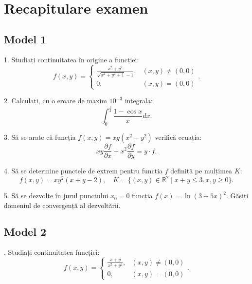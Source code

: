 \chapter{Recapitulare examen}

\section{Model 1}

1. Studiați continuitatea în origine a funcției:
\[
  f(x, y) = \begin{cases}
    \frac{x^2 + y^2}{\sqrt{x^2 + y^2 + 1} - 1}, & (x, y) \neq (0, 0) \\
    0, & (x, y) = (0, 0)
  \end{cases}.
\]

\vspace{1cm}

2. Calculați, cu o eroare de maxim $ 10^{-3} $ integrala:
\[
  \int_0^{\frac{1}{2}} \dfrac{1 - \cos x}{x} dx.
\]

\vspace{1cm}

3. Să se arate că funcția $ f(x, y) = xg(x^2 - y^2) $ verifică ecuația:
\[
  xy \frac{\partial f}{\partial x} + x^2 \frac{\partial f}{\partial y} = y \cdot f.
\]

\vspace{1cm}

4. Să se determine punctele de extrem pentru funcția $ f $ definită pe mulțimea $ K $:
\[
  f(x, y) = xy^2(x + y - 2), \quad %
  K = \{ (x, y) \in \mathbb{R}^2 \mid x + y \leq 3, x, y \geq 0 \}.
\]

\vspace{1cm}

5. Să se dezvolte în jurul punctului $ x_0 = 0 $ funcția $ f(x) = \ln(3 + 5x)^2 $.
Găsiți domeniul de convergență al dezvoltării.



\section{Model 2}

\indent{}. Studiați continuitatea funcției:
\[
  f(x, y) = \begin{cases}
    \frac{x + y}{x^2 + y^2}, & (x, y) \neq (0, 0) \\
    0, & (x, y) = (0, 0)
  \end{cases}.
\]

